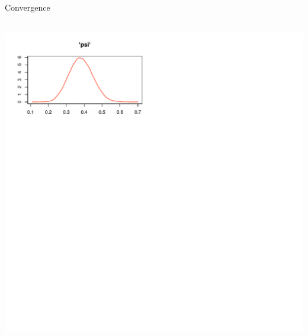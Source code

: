 \documentclass{beamer}
\begin{document}
\begin{frame}{Convergence}
	\begin{center}
		 \\
		\includegraphics[scale=0.8]{distnConvergence.pdf} \\
	\end{center}
\end{frame}
\end{document}
